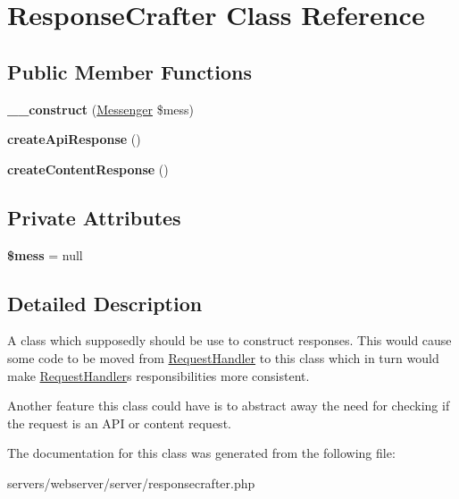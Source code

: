 \hypertarget{class_lora_1_1_response_crafter}{}\section{Response\+Crafter Class Reference}
\label{class_lora_1_1_response_crafter}
\subsection*{Public Member Functions}
\begin{DoxyCompactItemize}
\item 
\mbox{\label{class_lora_1_1_response_crafter_a0f26589919fbe0b92148546e3b28550d}} 
{\bfseries \+\_\+\+\_\+construct} (\hyperlink{class_lora_1_1_messenger}{Messenger} \$mess)
\item 
\mbox{\label{class_lora_1_1_response_crafter_a0b2e591a384bebadd72dc078266bc43c}} 
{\bfseries create\+Api\+Response} ()
\item 
\mbox{\label{class_lora_1_1_response_crafter_a25836d5e0d6ae86dad08025b8201b99b}} 
{\bfseries create\+Content\+Response} ()
\end{DoxyCompactItemize}
\subsection*{Private Attributes}
\begin{DoxyCompactItemize}
\item 
\mbox{\label{class_lora_1_1_response_crafter_a7402b7f726abbbfe8793e75fafcd5e91}} 
{\bfseries \$mess} = null
\end{DoxyCompactItemize}


\subsection{Detailed Description}
A class which supposedly should be use to construct responses. This would cause some code to be moved from \hyperlink{class_lora_1_1_request_handler}{Request\+Handler} to this class which in turn would make \hyperlink{class_lora_1_1_request_handler}{Request\+Handler}\textquotesingle{}s responsibilities more consistent.

Another feature this class could have is to abstract away the need for checking if the request is an A\+PI or content request. 

The documentation for this class was generated from the following file\+:\begin{DoxyCompactItemize}
\item 
servers/webserver/server/responsecrafter.\+php\end{DoxyCompactItemize}
